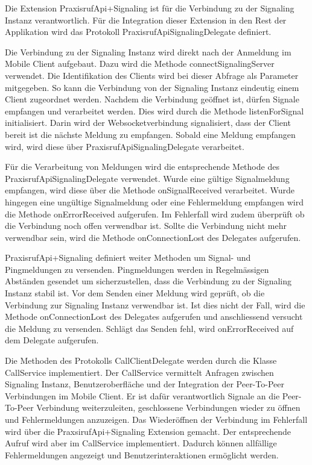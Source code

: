 Die Extension PraxisrufApi+Signaling ist für die Verbindung zu der Signaling Instanz verantwortlich.
Für die Integration dieser Extension in den Rest der Applikation wird das Protokoll PraxisrufApiSignalingDelegate definiert.

Die Verbindung zu der Signaling Instanz wird direkt nach der Anmeldung im Mobile Client aufgebaut.
Dazu wird die Methode connectSignalingServer verwendet.
Die Identifikation des Clients wird bei dieser Abfrage als Parameter mitgegeben.
So kann die Verbindung von der Signaling Instanz eindeutig einem Client zugeordnet werden.
Nachdem die Verbindung geöffnet ist, dürfen Signale empfangen und verarbeitet werden.
Dies wird durch die Methode listenForSignal initialisiert.
Darin wird der Websocketverbindung signalisiert, dass der Client bereit ist die nächste Meldung zu empfangen.
Sobald eine Meldung empfangen wird, wird diese über PraxisrufApiSignalingDelegate verarbeitet.

Für die Verarbeitung von Meldungen wird die entsprechende Methode des PraxisrufApiSignalingDelegate verwendet.
Wurde eine gültige Signalmeldung empfangen, wird diese über die Methode onSignalReceived verarbeitet.
Wurde hingegen eine ungültige Signalmeldung oder eine Fehlermeldung empfangen wird die Methode onErrorReceived aufgerufen.
Im Fehlerfall wird zudem überprüft ob die Verbindung noch offen verwendbar ist.
Sollte die Verbindung nicht mehr verwendbar sein, wird die Methode onConnectionLost des Delegates aufgerufen.

PraxisrufApi+Signaling definiert weiter Methoden um Signal- und Pingmeldungen zu versenden.
Pingmeldungen werden in Regelmässigen Abständen gesendet um sicherzustellen, dass die Verbindung zu der Signaling Instanz stabil ist.
Vor dem Senden einer Meldung wird geprüft, ob die Verbindung zur Signaling Instanz verwendbar ist.
Ist dies nicht der Fall, wird die Methode onConnectionLost des Delegates aufgerufen und anschliessend versucht die Meldung zu versenden.
Schlägt das Senden fehl, wird onErrorReceived auf dem Delegate aufgerufen.

Die Methoden des Protokolls CallClientDelegate werden durch die Klasse CallService implementiert.
Der CallService vermittelt Anfragen zwischen Signaling Instanz, Benutzeroberfläche und der Integration der Peer-To-Peer Verbindungen im Mobile Client.
Er ist dafür verantwortlich Signale an die Peer-To-Peer Verbindung weiterzuleiten, geschlossene Verbindungen wieder zu öffnen und Fehlermeldungen anzuzeigen.
Das Wiederöffnen der Verbindung im Fehlerfall wird über die PraxsirufApi+Signaling Extension gemacht.
Der entsprechende Aufruf wird aber im CallService implementiert.
Dadurch können allfällige Fehlermeldungen angezeigt und Benutzerinteraktionen ermöglicht werden.

